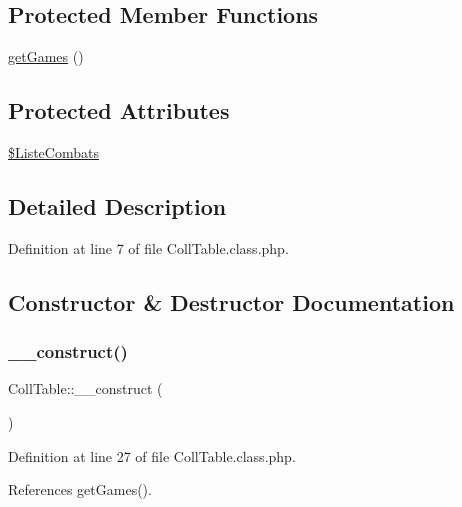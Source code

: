 \subsection*{Protected Member Functions}
\begin{DoxyCompactItemize}
\item 
\hyperlink{class_coll_table_a2550dbcff72781d7411ab095f0e46945}{get\+Games} ()
\end{DoxyCompactItemize}
\subsection*{Protected Attributes}
\begin{DoxyCompactItemize}
\item 
\hyperlink{class_coll_table_acb0c76041af79dd652385ab2cf0487d3}{\$\+Liste\+Combats}
\end{DoxyCompactItemize}


\subsection{Detailed Description}


Definition at line 7 of file Coll\+Table.\+class.\+php.



\subsection{Constructor \& Destructor Documentation}
\mbox{\label{class_coll_table_a349a8bdf7bf6a96ecce40e5b9cedcabf}} 
\subsubsection{\texorpdfstring{\+\_\+\+\_\+construct()}{\_\_construct()}}
{\footnotesize\ttfamily Coll\+Table\+::\+\_\+\+\_\+construct (\begin{DoxyParamCaption}{ }\end{DoxyParamCaption})}



Definition at line 27 of file Coll\+Table.\+class.\+php.



References get\+Games().

